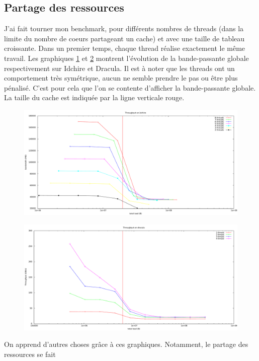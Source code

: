 \documentclass{report}
\begin{document}
\subsection{Partage des ressources}
J'ai fait tourner mon benchmark, pour différents nombres de threads (dans la limite du nombre de coeurs
partageant un cache) et avec une taille de tableau croissante. Dans un premier temps, chaque thread 
réalise exactement le même travail. Les graphiques \ref{fig:idchbench} et \ref{fig:dracbench} 
montrent l'évolution de la bande-passante globale respectivement sur Idchire et Dracula. Il est à 
noter que les threads ont un comportement très symétrique, aucun ne semble prendre le pas ou être
plus pénalisé. C'est pour cela que l'on se contente d'afficher la bande-passante globale. La taille
du cache est indiquée par la ligne verticale rouge.
\begin{figure}
  \includegraphics[width=\linewidth]{bandwidth_idch.pdf}
  \label{fig:idchbench}
\end{figure}
\begin{figure}
  \includegraphics[width=\linewidth]{bench_dracula.pdf}
  \label{fig:dracbench}
\end{figure}
On apprend d'autres choses grâce à ces graphiques. Notamment, le partage des ressources se fait
\end{document}
